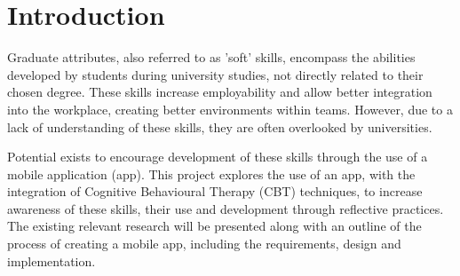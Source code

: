 \documentclass{l4proj}
\begin{document}
\tableofcontents

%
%
%
%
%
%
%
%
\chapter{Introduction}


Graduate attributes, also referred to as 'soft' skills, encompass the abilities developed by students during university studies, not directly related to their chosen degree. These skills increase employability and allow better integration into the workplace, creating better environments within teams. However, due to a lack of understanding of these skills, they are often overlooked by universities. 

Potential exists to encourage development of these skills through the use of a mobile application (app). This project explores the use of an app, with the integration of Cognitive Behavioural Therapy (CBT) techniques, to increase awareness of these skills, their use and development through reflective practices. The existing relevant research will be presented along with an outline of the process of creating a mobile app, including the requirements, design and implementation.
\end{document}
